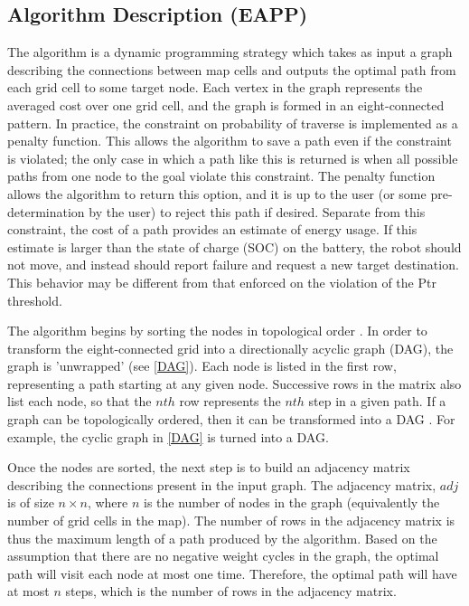 \documentclass[journal]{IEEEtran}
\newcounter{row}
\begin{document}
\subsection{Algorithm Description (EAPP)}
The algorithm is a dynamic programming strategy which takes as input a graph describing the connections between map cells and outputs the optimal path from each grid cell to some target node. 
Each vertex in the graph represents the averaged cost over one grid cell, and the graph is formed in an eight-connected pattern. 
In practice, the constraint on probability of traverse is implemented as a penalty function. 
This allows the algorithm to save a path even if the constraint is violated; the only case in which a path like this is returned is when all possible paths from one node to the goal violate this constraint. 
The penalty function allows the algorithm to return this option, and it is up to the user (or some pre-determination by the user) to reject this path if desired. 
Separate from this constraint, the cost of a path provides an estimate of energy usage. 
If this estimate is larger than the state of charge (SOC) on the battery, the robot should not move, and instead should report failure and request a new target destination. 
This behavior may be different from that enforced on the violation of the Ptr threshold.

The algorithm begins by sorting the nodes in topological order . 
In order to transform the eight-connected grid into a directionally acyclic graph (DAG), the graph is 'unwrapped' (see \ref{DAG}).
Each node is listed in the first row, representing a path starting at any given node. 
Successive rows in the matrix also list each node, so that the $nth$ row represents the $nth$ step in a given path. 
If a graph can be topologically ordered, then it can be transformed into a DAG \cite{vazirani algorithms ch. 6}. For example, the cyclic graph in \ref{DAG} is turned into a DAG.


Once the nodes are sorted, the next step is to build an adjacency matrix describing the connections present in the input graph.
The adjacency matrix, $adj$ is of size $n \times n$, where $n$ is the number of nodes in the graph (equivalently the number of grid cells in the map). 
The number of rows in the adjacency matrix is thus the maximum length of a path produced by the algorithm.
Based on the assumption that there are no negative weight cycles in the graph, the optimal path will visit each node at most one time.
Therefore, the optimal path will have at most $n$ steps, which is the number of rows in the adjacency matrix. 
\end{document}
